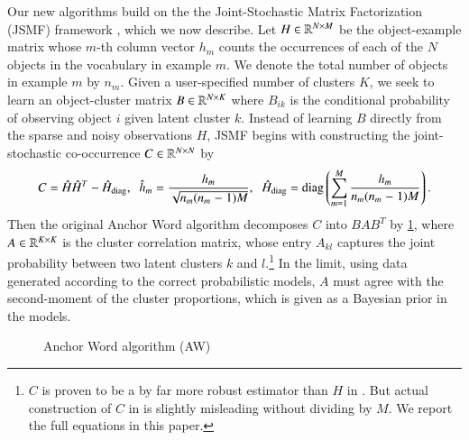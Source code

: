 Our new algorithms build on the the Joint\hyp{}Stochastic Matrix Factorization 
(JSMF) framework \cite{moontae2015nips}, which we now describe. Let $H \in
\mathbb{R}^{N \mathbin{\times} M}$ be the object\hyp{}example matrix whose $m$\hyp{}th column
vector $h_m$ counts the occurrences of each of the $N$ objects in the vocabulary
in example $m$. We denote the total number of objects in example $m$ by $n_m$.
Given a user-specified number of clusters $K$, we seek to learn an
object\hyp{}cluster matrix $B \in \mathbb{R}^{N \mathbin{\times} K}$ where $B_{ik}$ is the
conditional probability of observing object $i$ given latent cluster $k$.
Instead of learning $B$ directly from the sparse and noisy observations $H$,
JSMF begins with constructing the joint-stochastic co-occurrence $C \in \mathbb{R}^
{N \mathbin{\times} N}$ by
\begin{equation}
	C = \hat{H} \hat{H}^T - \hat{H}_{\operatorname{diag}}, \;\; \hat{h}_m \mathrel{=} \frac{h_m}{\sqrt{n_m
	(n_m \mathrel{-} 1)M}}, \;\; \hat{H}_{\operatorname{diag}} \mathrel{=} \operatorname{diag} \left( \sum_{m=1}^M \frac{h_m}
	{n_m(n_m \mathrel{-} 1)M} \right).
	\label{eqn:unbiased}
\end{equation}
Then the original Anchor Word algorithm decomposes $C$ into $B A B^T$ by
\cref{alg:awa}, where $A \in \mathbb{R}^{K \mathbin{\times} K}$ is the cluster correlation
matrix, whose entry $A_{kl}$ captures the joint probability between two latent
clusters $k$ and $l$.\footnote{$C$ is proven to be a by far more robust
estimator than $H$ in \cite{AGM}.  But actual construction of $C$ in 
\cite{arora2013practical} is slightly misleading without dividing by $M$. We
report the full equations in this paper.} In the limit, using data generated
according to the correct probabilistic models, $A$ must agree with the
second\hyp{}moment of the cluster proportions, which is given as a Bayesian
prior in the models.

\begin{figure}[ht]
	\begin{algorithm}[H]
		\DontPrintSemicolon
		\caption{Anchor Word algorithm (AW)}
	\label{alg:awa}        
	\end{algorithm}
\end{figure}

